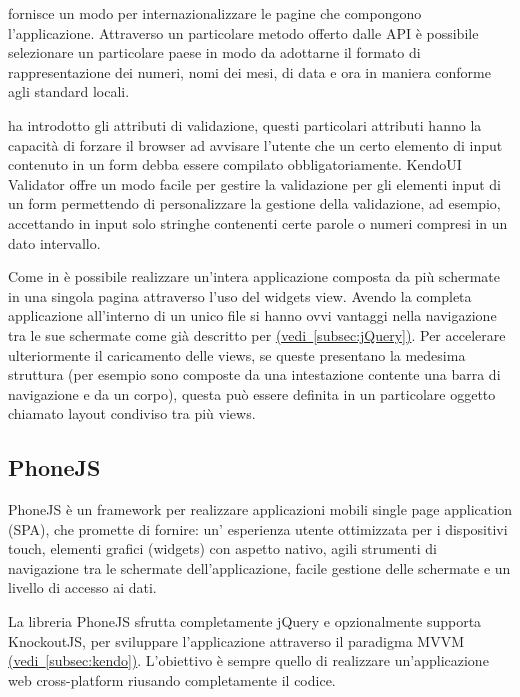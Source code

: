             \kendomob{} fornisce un modo per internazionalizzare le pagine che
            compongono l'applicazione. Attraverso un particolare metodo offerto
            dalle API è possibile selezionare un particolare paese in modo da
            adottarne il formato di rappresentazione dei numeri, nomi dei mesi,
            di data e ora in maniera conforme agli standard locali.

             ha introdotto gli attributi di validazione, questi particolari
            attributi hanno la capacità di forzare il browser ad avvisare
            l'utente che un certo elemento di input contenuto in un form debba
            essere compilato obbligatoriamente. KendoUI Validator offre un modo
            facile per gestire la validazione per gli elementi input di un form
            permettendo di personalizzare la gestione della validazione, ad
            esempio, accettando in input solo stringhe contenenti certe parole o
            numeri compresi in un dato intervallo.

            Come in \jqm{} è possibile realizzare un'intera applicazione
            composta da più schermate in una singola pagina \html{} attraverso l'uso
            del widgets view. Avendo la completa applicazione all'interno di un
            unico file si hanno ovvi vantaggi nella navigazione tra le sue schermate
            come già descritto per \jqm{}
            \hyperref[subsec:jQuery]{(vedi~\ref{subsec:jQuery})}.
            Per accelerare ulteriormente il caricamento delle views, se queste
            presentano la medesima struttura (per esempio sono composte da una
            intestazione contente una barra di navigazione e da un corpo),
            questa può essere definita in un particolare oggetto chiamato layout
            condiviso tra più views.

        \subsection{PhoneJS}
            PhoneJS è un frame\-work per realizzare applicazioni mobili
            single page application (SPA), che promette di fornire: un'
            esperienza utente ottimizzata per i dispositivi touch, elementi
            grafici (widgets) con
            aspetto nativo, agili strumenti di navigazione tra le schermate
            dell'applicazione, facile gestione delle schermate e un livello di
            accesso ai dati.

            La libreria PhoneJS sfrutta completamente jQuery e opzionalmente
            supporta KnockoutJS, per sviluppare l'applicazione attraverso il paradigma
            MVVM \hyperref[subsec:kendo]{(vedi~\ref{subsec:kendo})}.
            L'obiettivo è sempre quello di realizzare un'applicazione web cross-platform
            riusando completamente il codice.

